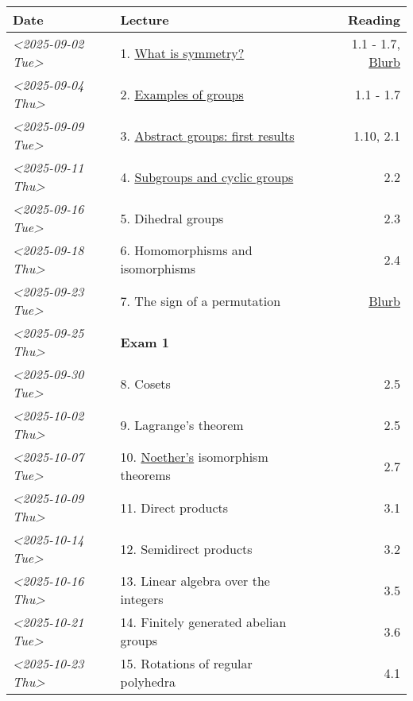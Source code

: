 \documentclass[11pt]{article}
\begin{document}
\begin{center}
\begin{tabular}{l|l|r}
\hline
Date & Lecture & Reading\\[0pt]
\hline
\textit{<2025-09-02 Tue>} & 1. \href{https://www.dropbox.com/scl/fi/p1wxilymw0vyhqvnk3z0a/Lecture-1.pdf?rlkey=wz6pvevnvakryws6uz4t8jsgx\&st=oihmxpsu\&dl=0}{What is symmetry?} & 1.1 - 1.7, \href{https://kconrad.math.uconn.edu/blurbs/grouptheory/whygroups.pdf}{Blurb}\\[0pt]
\textit{<2025-09-04 Thu>} & 2. \href{https://www.dropbox.com/scl/fi/ye5ewjg4w53js9i9nnlqp/Lecture-2.pdf?rlkey=en0vp8k0mxcdldak8rpebqe5w\&st=q1vmzgj1\&dl=0}{Examples of groups} & 1.1 - 1.7\\[0pt]
\textit{<2025-09-09 Tue>} & 3. \href{https://www.dropbox.com/scl/fi/5fn0wkb6ejtsk79mqsjpc/Lecture-3.pdf?rlkey=2v43ltzmasna2gk3lyqmmoulk\&dl=0}{Abstract groups: first results} & 1.10, 2.1\\[0pt]
\textit{<2025-09-11 Thu>} & 4. \href{https://www.dropbox.com/scl/fi/17ji5counqyvroky0zxh7/Lecture-4.pdf?rlkey=ihh68st77av0gy3322151n05e\&dl=0}{Subgroups and cyclic groups} & 2.2\\[0pt]
\textit{<2025-09-16 Tue>} & 5. Dihedral groups & 2.3\\[0pt]
\textit{<2025-09-18 Thu>} & 6. Homomorphisms and isomorphisms & 2.4\\[0pt]
\textit{<2025-09-23 Tue>} & 7. The sign of a permutation & \href{https://kconrad.math.uconn.edu/blurbs/grouptheory/sign.pdf}{Blurb}\\[0pt]
\textit{<2025-09-25 Thu>} & \textbf{Exam 1} & \\[0pt]
\textit{<2025-09-30 Tue>} & 8. Cosets & 2.5\\[0pt]
\textit{<2025-10-02 Thu>} & 9. Lagrange's theorem & 2.5\\[0pt]
\textit{<2025-10-07 Tue>} & 10. \href{https://en.wikipedia.org/wiki/Emmy\_Noether}{Noether's} isomorphism theorems & 2.7\\[0pt]
\textit{<2025-10-09 Thu>} & 11. Direct products & 3.1\\[0pt]
\textit{<2025-10-14 Tue>} & 12. Semidirect products & 3.2\\[0pt]
\textit{<2025-10-16 Thu>} & 13. Linear algebra over the integers & 3.5\\[0pt]
\textit{<2025-10-21 Tue>} & 14. Finitely generated abelian groups & 3.6\\[0pt]
\textit{<2025-10-23 Thu>} & 15. Rotations of regular polyhedra & 4.1\\[0pt]

\end{tabular}
\end{center}
\end{document}
